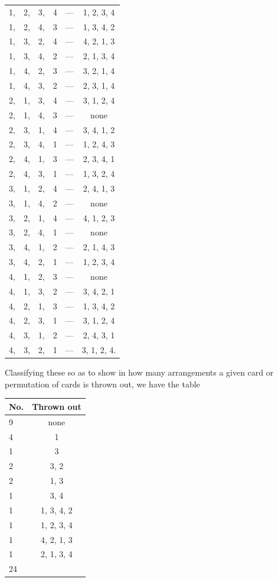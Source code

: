 \documentclass[11pt,a4paper]{book}
\begin{document}
\begin{center}
\begin{tabular}{cccccc}
1, & 2, & 3, & 4 &---& 1, 2, 3, 4 \\
1, & 2, & 4, & 3 &---& 1, 3, 4, 2 \\
1, & 3, & 2, & 4 &---& 4, 2, 1, 3 \\
1, & 3, & 4, & 2 &---& 2, 1, 3, 4 \\
1, & 4, & 2, & 3 &---& 3, 2, 1, 4 \\
1, & 4, & 3, & 2 &---& 2, 3, 1, 4 \\
2, & 1, & 3, & 4 &---& 3, 1, 2, 4 \\
2, & 1, & 4, & 3 &---& none \\
2, & 3, & 1, & 4 &---& 3, 4, 1, 2 \\
2, & 3, & 4, & 1 &---& 1, 2, 4, 3 \\
2, & 4, & 1, & 3 &---& 2, 3, 4, 1 \\
2, & 4, & 3, & 1 &---& 1, 3, 2, 4 \\
3, & 1, & 2, & 4 &---& 2, 4, 1, 3 \\
3, & 1, & 4, & 2 &---& none \\
3, & 2, & 1, & 4 &---& 4, 1, 2, 3 \\
3, & 2, & 4, & 1 &---& none \\
3, & 4, & 1, & 2 &---& 2, 1, 4, 3 \\
3, & 4, & 2, & 1 &---& 1, 2, 3, 4 \\
4, & 1, & 2, & 3 &---& none \\
4, & 1, & 3, & 2 &---& 3, 4, 2, 1 \\
4, & 2, & 1, & 3 &---& 1, 3, 4, 2 \\
4, & 2, & 3, & 1 &---& 3, 1, 2, 4 \\
4, & 3, & 1, & 2 &---& 2, 4, 3, 1 \\
4, & 3, & 2, & 1 &---& 3, 1, 2, 4.
\end{tabular}
\end{center}

Classifying these so as to show in how many arrangements a given card or permutation of cards is thrown out, we have the table

\begin{center}
\begin{tabular}{lc}
No. & Thrown out \\
\midrule
9 & none \\
4 & 1 \\
1 & 3 \\
2 & 3, 2 \\
2 & 1, 3 \\
1 & 3, 4 \\
1 & 1, 3, 4, 2 \\
1 & 1, 2, 3, 4 \\
1 & 4, 2, 1, 3 \\
1 & 2, 1, 3, 4 \\
\midrule
24 &
\end{tabular}
\end{center}
\end{document}
